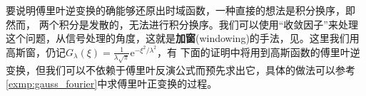 要说明傅里叶逆变换的确能够还原出时域函数，一种直接的想法是积分换序，即
然而，
两个积分是发散的，无法进行积分换序。我们可以使用“收敛因子”来处理这个问题，从信号处理的角度，这就是\textbf{加窗}(windowing)的手法，见。这里我们用高斯窗，仍记$G_\lambda(\xi)=\frac{1}{\lambda\sqrt{\pi}}\mathrm{e}^{-\xi^2/\lambda^2}$，有
下面的证明中将用到高斯函数的傅里叶逆变换，但我们可以不依赖于傅里叶反演公式而预先求出它，具体的做法可以参考\cref{exmp:gauss_fourier}中求傅里叶正变换的过程。
